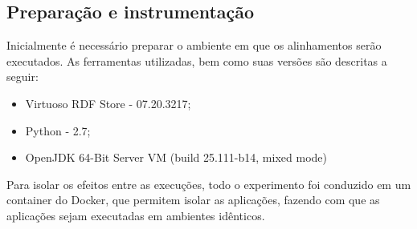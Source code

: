 \subsection*{Preparação e instrumentação}
Inicialmente é necessário preparar o ambiente em que os alinhamentos serão executados. As ferramentas utilizadas, bem como suas versões são descritas a seguir:

\begin{itemize}
\item Virtuoso RDF Store - 07.20.3217;
\item Python - 2.7;
\item OpenJDK 64-Bit Server VM (build 25.111-b14, mixed mode)

\end{itemize}

Para isolar os efeitos entre as execuções, todo o experimento foi conduzido em um container do Docker, que permitem isolar as aplicações, fazendo com que as aplicações sejam executadas em ambientes idênticos.
